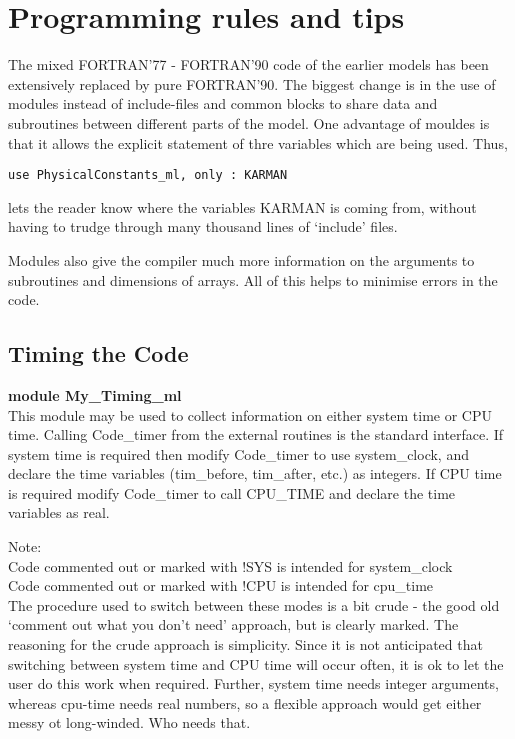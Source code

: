 \chapter{Programming rules and tips}


The mixed FORTRAN'77 - FORTRAN'90 code of the earlier models
has been extensively replaced by pure FORTRAN'90. The biggest change
is in the use of modules instead of include-files and common blocks
to share data and subroutines between different parts of the model.
One advantage of mouldes is that it allows the explicit statement
of thre variables which are being used. Thus,

\begin{verbatim}
use PhysicalConstants_ml, only : KARMAN
\end{verbatim}

\noindent
lets the reader know where the variables KARMAN is coming from, without
having to trudge through many thousand lines of `include' files.


Modules also give the compiler much more information on the
arguments to subroutines and dimensions of arrays. All of this
helps to minimise errors in the code.


\section{Timing the Code}

{\bf module My\_Timing\_ml}\\


\noindent
This module may be used to collect information on either system time or
 CPU time. Calling Code\_timer from the external routines is the standard
 interface. If system time is required then modify Code\_timer to
 use system\_clock, and declare the time variables (tim\_before, tim\_after, etc.)
 as integers. If CPU time is required modify Code\_timer to call
 CPU\_TIME and declare the time variables as real.
\bigskip

\noindent
Note:\\
 Code commented out or marked with !SYS is intended for system\_clock\\
 Code commented out or marked with !CPU is intended for cpu\_time\\


The procedure used to switch between these modes is a bit crude - the good
old `comment out what you don't need' approach, but is clearly marked.
The reasoning for the crude approach is simplicity. Since it is not anticipated
that switching between system time and CPU time will occur often, it is
ok to let the user do this work when required. Further, system time needs
integer arguments, whereas cpu-time needs real numbers, so a flexible
approach would get either messy ot long-winded. Who needs that.


